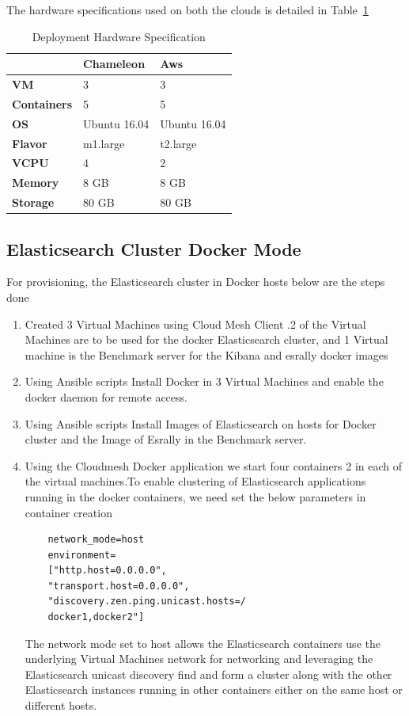 \documentclass[9pt,twocolumn,twoside]{../../styles/osajnl}
\begin{document}
The hardware specifications used on both the clouds is detailed in Table~\ref{tab:eshardware}

\begin{table}[h]
\centering
\caption{Deployment Hardware Specification}
\label{tab:eshardware}
\begin{tabular}{|l|l|l|}
\hline
 & \textbf{Chameleon} & \textbf{Aws} \\ \hline
\textbf{VM} & 3 & 3 \\
\textbf{Containers} & 5 & 5 \\
\textbf{OS} & Ubuntu 16.04 & Ubuntu 16.04 \\
\textbf{Flavor} & m1.large & t2.large \\
\textbf{VCPU} & 4 & 2 \\
\textbf{Memory} & 8 GB & 8 GB \\
\textbf{Storage} & 80 GB & 80 GB\\
\hline
\end{tabular}
\end{table}
 


 \subsection{Elasticsearch Cluster Docker Mode}
  For provisioning, the Elasticsearch cluster in Docker hosts below are the steps done
\begin{enumerate}
\item Created 3 Virtual Machines using Cloud Mesh Client .2 of the Virtual Machines  are to be used for the docker Elasticsearch cluster, and 1 Virtual machine is the Benchmark server for the Kibana and esrally docker images 
\item Using Ansible scripts Install Docker in 3 Virtual Machines and enable the docker daemon for remote access.
\item Using Ansible scripts Install Images of Elasticsearch on hosts for Docker cluster and the Image of Esrally in the Benchmark server.
\item Using the Cloudmesh Docker application we start four containers 2 in each of the virtual machines.To enable clustering of Elasticsearch applications running in the docker containers, we need set the below parameters in container creation
\begin{verbatim}
    network_mode=host 
    environment=
    ["http.host=0.0.0.0",
    "transport.host=0.0.0.0",
    "discovery.zen.ping.unicast.hosts=/
    docker1,docker2"]
\end{verbatim}

The network mode set to host allows the Elasticsearch containers use the underlying Virtual Machines  network for networking and leveraging the Elasticsearch unicast discovery find and form a cluster along with the other Elasticsearch instances running in other
containers either on the same host or different hosts.

\end{enumerate}
\end{document}
